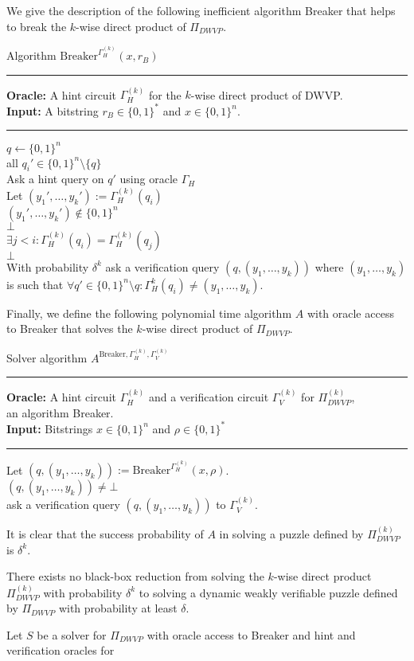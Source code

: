 We give the description of the following inefficient algorithm Breaker that helps to break the $k$-wise direct product of $\Pi_{DWVP}$.
\begin{codeblock}
  Algorithm $\text{Breaker}^{\Gamma_H^{(k)}}(x, r_B)$
  \medskip \hrule \medskip
  \textbf{Oracle:}  A hint circuit $\Gamma_H^{(k)}$ for the $k$-wise direct product of DWVP. \\
  \textbf{Input:}  A bitstring $r_B \in \{0,1\}^{*}$ and $x \in \{0,1\}^{n}$.
  \medskip\hrule\medskip
  $q \leftarrow \{0,1\}^{n}$ \\
  \For all $q_i' \in \{0,1\}^{n} \setminus \{q\}$ \Do \\
  \IndI Ask a hint query on $q'$ using oracle $\Gamma_H$\\
  \IndI Let $(y_1', \dotsc, y_k') := \Gamma_H^{(k)}(q_i)$ \\
  \IndI \If $(y_1', \dotsc, y_k') \notin \{0,1\}^{n}$ \Then \\
  \IndII \Return $\bot$ \\
  \IndI \If $\exists j < i : \Gamma_H^{(k)}(q_i) = \Gamma_H^{(k)}(q_j)$ \Then \\
  \IndII \Return $\bot$ \\
  With probability $\delta^{k}$ ask a verification query $(q,(y_1, \dotsc, y_k))$ where $(y_1, \dotsc, y_k)$ is such that
  $\forall q' \in \{0,1\}^{n} \setminus q : \Gamma_H^{k}(q_i) \neq (y_1, \dotsc, y_k)$.
\end{codeblock}
Finally, we define the following polynomial time algorithm $A$ with oracle access to Breaker that solves the $k$-wise direct product of $\Pi_{DWVP}$.
\begin{codeblock}
  Solver algorithm $A^{\text{Breaker}, \Gamma_H^{(k)}, \Gamma_V^{(k)}}$
  \medskip \hrule \medskip
  \textbf{Oracle:} A hint circuit $\Gamma_H^{(k)}$ and a verification circuit $\Gamma_V^{(k)}$ for $\Pi_{DWVP}^{(k)}$, \\
  \IndII an algorithm Breaker. \\
  \textbf{Input:}  Bitstrings $x \in \{0,1\}^{n}$ and $\rho \in \{0,1\}^{*}$
  \medskip\hrule\medskip
  Let $(q, (y_1, \dotsc, y_k)) := \text{Breaker}^{\Gamma_H^{(k)}}(x, \rho)$. \\
  \If $(q, (y_1, \dotsc, y_k)) \neq \bot$ \Then \\
  \IndI ask a verification query $(q, (y_1, \dotsc, y_k))$ to $\Gamma_V^{(k)}$.
\end{codeblock}
It is clear that the success probability of $A$ in solving a puzzle defined by $\Pi_{DWVP}^{(k)}$ is $\delta^k$.

\begin{theorem}
\label{thm:no_black_box_reduction}
There exists no black-box reduction from solving the $k$-wise direct product $\Pi_{DWVP}^{(k)}$ with probability $\delta^{k}$
to solving a dynamic weakly verifiable puzzle defined by $\Pi_{DWVP}$ with probability at least $\delta$.
\end{theorem}

\begin{lemma}
Let $S$ be a solver for $\Pi_{DWVP}$ with oracle access to Breaker and hint and verification oracles for 
\end{lemma}

